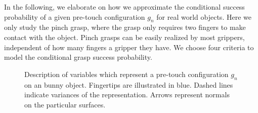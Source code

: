 In the following, we elaborate on how we approximate the conditional success probability of a given pre-touch configuration $g_n$ for real world objects. Here we only study the pinch grasp, where the grasp only requires two fingers to make contact with the object. Pinch grasps can be easily realized by most grippers, independent of how many fingers a gripper they have. We choose four criteria to model the conditional grasp success probability. 

\begin{figure}[!htbp]
\centering
\def\svgwidth{0.7\linewidth}

\caption{Description of variables which represent a pre-touch configuration $g_n$ on an bunny object. Fingertips are illustrated in blue. Dashed lines indicate variances of the representation. Arrows represent normals on the particular surfaces.}
\label{fig:grasp_generation}
\end{figure}


